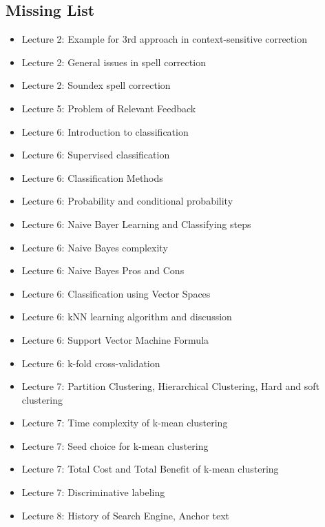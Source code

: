 \begin{multicols*}{2}
\section{Missing List}

\begin{itemize}
    \item Lecture 2: Example for 3rd approach in context-sensitive correction
    \item Lecture 2: General issues in spell correction
    \item Lecture 2: Soundex spell correction
    \item Lecture 5: Problem of Relevant Feedback
    \item Lecture 6: Introduction to classification
    \item Lecture 6: Supervised classification
    \item Lecture 6: Classification Methods
    \item Lecture 6: Probability and conditional probability
    \item Lecture 6: Naive Bayer Learning and Classifying steps
    \item Lecture 6: Naive Bayes complexity
    \item Lecture 6: Naive Bayes Pros and Cons
    \item Lecture 6: Classification using Vector Spaces
    \item Lecture 6: kNN learning algorithm and discussion
    \item Lecture 6: Support Vector Machine Formula
    \item Lecture 6: k-fold cross-validation
    \item Lecture 7: Partition Clustering, Hierarchical Clustering, Hard and soft clustering
    \item Lecture 7: Time complexity of k-mean clustering
    \item Lecture 7: Seed choice for k-mean clustering
    \item Lecture 7: Total Cost and Total Benefit of k-mean clustering
    \item Lecture 7: Discriminative labeling
    \item Lecture 8: History of Search Engine, Anchor text
\end{itemize}

\end{multicols*}
